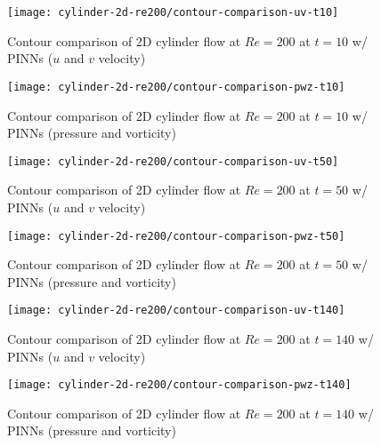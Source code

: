 \begin{figure}[!hbt]
    \centering%
    \texttt{[image: cylinder-2d-re200/contour-comparison-uv-t10]}%
    \caption{%
        Contour comparison of 2D cylinder flow at $Re=\num{200}$ at $t=10$ w/ PINNs ($u$ and $v$ velocity)
    }
    \label{fig:cylinder-re200-pinn-contours-uv-t10}%
\end{figure}

\begin{figure}[!hbt]
    \centering%
    \texttt{[image: cylinder-2d-re200/contour-comparison-pwz-t10]}%
    \caption{%
        Contour comparison of 2D cylinder flow at $Re=\num{200}$ at $t=10$ w/ PINNs (pressure and vorticity)
    }
    \label{fig:cylinder-re200-pinn-contours-pwz-t10}%
\end{figure}

\begin{figure}[!hbt]
    \centering%
    \texttt{[image: cylinder-2d-re200/contour-comparison-uv-t50]}%
    \caption{%
        Contour comparison of 2D cylinder flow at $Re=\num{200}$ at $t=50$ w/ PINNs ($u$ and $v$ velocity)
    }
    \label{fig:cylinder-re200-pinn-contours-uv-t50}%
\end{figure}

\begin{figure}[!hbt]
    \centering%
    \texttt{[image: cylinder-2d-re200/contour-comparison-pwz-t50]}%
    \caption{%
        Contour comparison of 2D cylinder flow at $Re=\num{200}$ at $t=50$ w/ PINNs (pressure and vorticity)
    }
    \label{fig:cylinder-re200-pinn-contours-pwz-t50}%
\end{figure}

\begin{figure}[!hbt]
    \centering%
    \texttt{[image: cylinder-2d-re200/contour-comparison-uv-t140]}%
    \caption{%
        Contour comparison of 2D cylinder flow at $Re=\num{200}$ at $t=140$ w/ PINNs ($u$ and $v$ velocity)
    }
    \label{fig:cylinder-re200-pinn-contours-uv-t140}%
\end{figure}

\begin{figure}[!hbt]
    \centering%
    \texttt{[image: cylinder-2d-re200/contour-comparison-pwz-t140]}%
    \caption{%
        Contour comparison of 2D cylinder flow at $Re=\num{200}$ at $t=140$ w/ PINNs (pressure and vorticity)
    }
    \label{fig:cylinder-re200-pinn-contours-pwz-t140}%
\end{figure}

